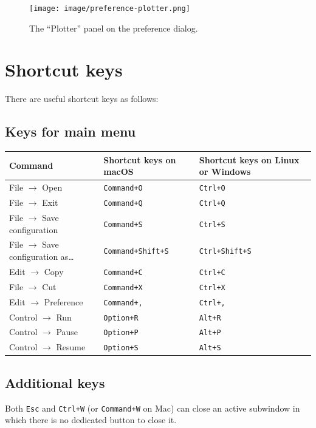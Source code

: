 \documentclass[a4paper,10pt]{report}
\begin{document}
\begin{figure}[htbp]
\centering
\texttt{[image: image/preference-plotter.png]}
\caption{\label{fig:org5664bc9}The ``Plotter'' panel on the preference dialog.}
\end{figure}

\section{Shortcut keys}
\label{sec:orgd586352}
There are useful shortcut keys as follows:

\subsection{Keys for main menu}
\label{sec:orgf85e5f2}
\begin{center}
\begin{tabular}{l||l|l}
Command & Shortcut keys on macOS & Shortcut keys on Linux or Windows\\
\hline
File \(\to\) Open & \texttt{Command+O} & \texttt{Ctrl+O}\\
File \(\to\) Exit & \texttt{Command+Q} & \texttt{Ctrl+Q}\\
File \(\to\) Save configuration & \texttt{Command+S} & \texttt{Ctrl+S}\\
File \(\to\) Save configuration as\ldots{} & \texttt{Command+Shift+S} & \texttt{Ctrl+Shift+S}\\
Edit \(\to\) Copy & \texttt{Command+C} & \texttt{Ctrl+C}\\
File \(\to\) Cut & \texttt{Command+X} & \texttt{Ctrl+X}\\
Edit \(\to\) Preference & \texttt{Command+,} & \texttt{Ctrl+,}\\
Control \(\to\) Run & \texttt{Option+R} & \texttt{Alt+R}\\
Control \(\to\) Pause & \texttt{Option+P} & \texttt{Alt+P}\\
Control \(\to\) Resume & \texttt{Option+S} & \texttt{Alt+S}\\
\end{tabular}
\end{center}

\subsection{Additional keys}
\label{sec:org258f983}
Both \texttt{Esc} and \texttt{Ctrl+W} (or \texttt{Command+W} on Mac) can close an active
subwindow in which there is no dedicated button to close it.
\end{document}
